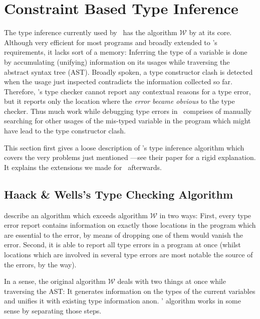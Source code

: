 
\section{Constraint Based Type Inference}
\label{sec:typeinfer}

The type inference currently used by \ocaml\ has the algorithm $\mathcal W$ by
\citet{damasmilner} at its core.
Although very efficient for most programs and broadly extended to \ocaml's 
requirements, it lacks sort of a memory:
Inferring the type of a variable is done by accumulating (unifying) information
on its usages while traversing the abstract syntax tree (AST).
Broadly spoken, a type constructor clash is detected when the usage just
inspected contradicts the information collected so far.
Therefore, \ocaml's type checker cannot report any contextual reasons for a type
error, but it reports only the location where the \emph{error became obvious} to
the type checker.
Thus much work while debugging type errors in \ocaml\ comprises of manually
searching for other usages of the mis-typed variable in the program which might
have lead to the type constructor clash.

This section first gives a loose description of \citeauthor{haackwells04}'s type
inference algorithm which covers the very problems just mentioned
---see their \citeyear{haackwells04} paper for a rigid explanation.
It explains the extensions we made for \easyocaml\ afterwards.

\subsection{Haack \& Wells's Type Checking Algorithm}

\citet{haackwells04} describe an algorithm which exceeds algorithm $\mathcal W$
in two ways:
First, every type error report contains information on exactly those
locations in the program which are essential to the error, by means of dropping
one of them would vanish the error.
Second, it is able to report all type errors in a program at once (whilst
locations which are involved in several type errors are most notable the source
of the errors, by the way).

In a sense, the original algorithm $\mathcal W$ deals with two things at once
while traversing the AST: It generates information on the types of the
current variables and unifies it with existing type information anon.
\citeauthor{haackwells04}' algorithm works in some sense by separating those
steps.

